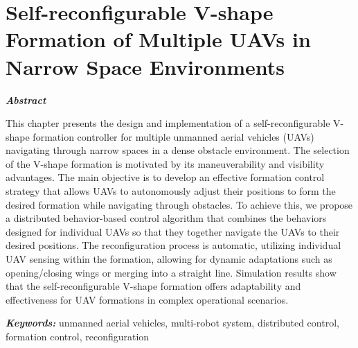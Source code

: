 \chapter{Self-reconfigurable V-shape Formation of Multiple UAVs in Narrow Space Environments}\label{paper1}

\vspace{1cm}

\noindent\textit{\textbf{Abstract}}

This chapter presents the design and implementation of a self-reconfigurable V-shape formation controller for multiple unmanned aerial vehicles (UAVs) navigating through narrow spaces in a dense obstacle environment. The selection of the V-shape formation is motivated by its maneuverability and visibility advantages. The main objective is to develop an effective formation control strategy that allows UAVs to autonomously adjust their positions to form the desired formation while navigating through obstacles. To achieve this, we propose a distributed behavior-based control algorithm that combines the behaviors designed for individual UAVs so that they together navigate the UAVs to their desired positions. The reconfiguration process is automatic, utilizing individual UAV sensing within the formation, allowing for dynamic adaptations such as opening/closing wings or merging into a straight line. Simulation results show that the self-reconfigurable V-shape formation offers adaptability and effectiveness for UAV formations in complex operational scenarios. 

\noindent\textbf{\textit{Keywords:}}
unmanned aerial vehicles, multi-robot system, distributed control, formation control, reconfiguration







